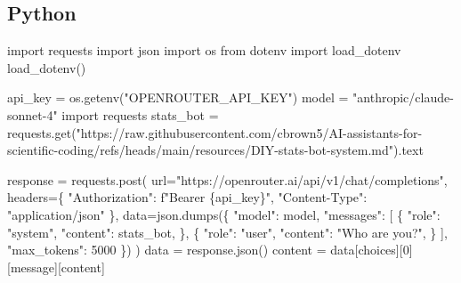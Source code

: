 \documentclass[
  letterpaper,
  DIV=11,
  numbers=noendperiod]{scrreprt}
\newenvironment{Shaded}{\begin{snugshade}}{\end{snugshade}}
\newcommand{\DecValTok}[1]{\textcolor[rgb]{0.68,0.00,0.00}{#1}}
\newcommand{\ImportTok}[1]{\textcolor[rgb]{0.00,0.46,0.62}{#1}}
\newcommand{\NormalTok}[1]{\textcolor[rgb]{0.00,0.23,0.31}{#1}}
\newcommand{\OperatorTok}[1]{\textcolor[rgb]{0.37,0.37,0.37}{#1}}
\newcommand{\SpecialCharTok}[1]{\textcolor[rgb]{0.37,0.37,0.37}{#1}}
\newcommand{\SpecialStringTok}[1]{\textcolor[rgb]{0.13,0.47,0.30}{#1}}
\newcommand{\StringTok}[1]{\textcolor[rgb]{0.13,0.47,0.30}{#1}}
\begin{document}
\subsection{Python}

\begin{Shaded}
\begin{Highlighting}[]
\ImportTok{import}\NormalTok{ requests}
\ImportTok{import}\NormalTok{ json}
\ImportTok{import}\NormalTok{ os}
\ImportTok{from}\NormalTok{ dotenv }\ImportTok{import}\NormalTok{ load\_dotenv}
\NormalTok{load\_dotenv()}

\NormalTok{api\_key }\OperatorTok{=}\NormalTok{ os.getenv(}\StringTok{"OPENROUTER\_API\_KEY"}\NormalTok{)}
\NormalTok{model }\OperatorTok{=} \StringTok{"anthropic/claude{-}sonnet{-}4"}
\ImportTok{import}\NormalTok{ requests}
\NormalTok{stats\_bot }\OperatorTok{=}\NormalTok{ requests.get(}\StringTok{"https://raw.githubusercontent.com/cbrown5/AI{-}assistants{-}for{-}scientific{-}coding/refs/heads/main/resources/DIY{-}stats{-}bot{-}system.md"}\NormalTok{).text}

\NormalTok{response }\OperatorTok{=}\NormalTok{ requests.post(}
\NormalTok{  url}\OperatorTok{=}\StringTok{"https://openrouter.ai/api/v1/chat/completions"}\NormalTok{,}
\NormalTok{  headers}\OperatorTok{=}\NormalTok{\{}
    \StringTok{"Authorization"}\NormalTok{: }\SpecialStringTok{f"Bearer }\SpecialCharTok{\{}\NormalTok{api\_key}\SpecialCharTok{\}}\SpecialStringTok{"}\NormalTok{,}
    \StringTok{"Content{-}Type"}\NormalTok{: }\StringTok{"application/json"}
\NormalTok{  \},}
\NormalTok{  data}\OperatorTok{=}\NormalTok{json.dumps(\{}
    \StringTok{"model"}\NormalTok{: model,}
    \StringTok{"messages"}\NormalTok{: [}
\NormalTok{      \{}
        \StringTok{"role"}\NormalTok{: }\StringTok{"system"}\NormalTok{,}
        \StringTok{"content"}\NormalTok{: stats\_bot,}
\NormalTok{      \},}
\NormalTok{      \{}
        \StringTok{"role"}\NormalTok{: }\StringTok{"user"}\NormalTok{,}
        \StringTok{"content"}\NormalTok{: }\StringTok{"Who are you?"}\NormalTok{,}
\NormalTok{      \}}
\NormalTok{    ],}
    \StringTok{"max\_tokens"}\NormalTok{: }\DecValTok{5000}
\NormalTok{  \})}
\NormalTok{)}
\NormalTok{data }\OperatorTok{=}\NormalTok{ response.json()}
\NormalTok{content }\OperatorTok{=}\NormalTok{ data[}\StringTok{\textquotesingle{}choices\textquotesingle{}}\NormalTok{][}\DecValTok{0}\NormalTok{][}\StringTok{\textquotesingle{}message\textquotesingle{}}\NormalTok{][}\StringTok{\textquotesingle{}content\textquotesingle{}}\NormalTok{]}
\end{Highlighting}
\end{Shaded}
\end{document}
